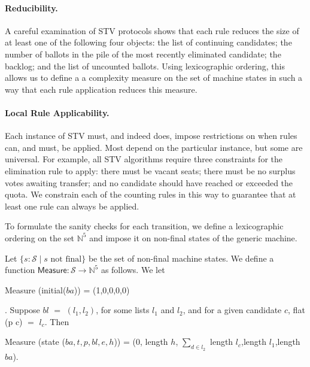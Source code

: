 \documentclass{llncs}
\begin{document}
\paragraph{Reducibility.} 
A careful examination of STV protocols shows that each rule
reduces the size of at least one of the following four
objects: the list of continuing candidates; the number of 
ballots in the pile of the most recently eliminated candidate;  the
backlog; and the list of uncounted ballots. Using lexicographic
ordering, this allows us to define a 
a complexity measure on the set of
machine states in such a way that each rule application reduces this
measure. 

\paragraph{Local Rule Applicability.}
Each instance of STV must, and indeed does, impose 
restrictions on when rules can, and must, be applied. Most
depend on the particular instance, but some
are universal. For example, all STV
algorithms require three constraints for the elimination
rule to apply: there must be vacant seats; there must be
no surplus votes awaiting transfer; and no candidate should have
reached or exceeded the quota. We constrain each of the counting
rules in this way to guarantee that at least one rule can always be
applied. 

To formulate the sanity checks for each transition, we 
define a lexicographic ordering on the set 
$\mathbb{N}^5$
and impose it on non-final states of the generic machine.   

\begin{definition} \label{defn:measure}
Let $\{s: \mathcal{S} \mid s\mbox{ not final}\}$ be the set of
non-final machine states. We define a function $\mathsf{Measure}:
\mathcal{S} \to
\mathbb{N}^5$ as follows. We let
\begin{small}\textsf{Measure} (\textsf{initial}($ba$)) = (1,0,0,0,0)\end{small}. Suppose $bl$ $=$ $(l_{1},l_{2})$, for some lists $l_{1}$ and $l_{2}$, and for a given candidate $c$, \textsf{flat} (p c) $=$ $l_{c}$. Then
\begin{small}
\begin{center}
 \textsf{Measure} (\textsf{state} ($ba,t,p,bl,e,h$)) = (0,
 \textsf{length} $h$, $\sum_{d\in l_{2}}^{}$ \textsf{length}
 $l_{c}$,\textsf{length} $l_{1}$,\textsf{length}  $ba$).
\end{center}
\end{small}
\end{definition}
\end{document}
